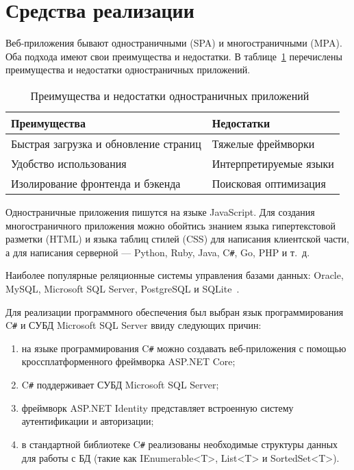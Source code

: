 \documentclass{bmstu}
\begin{document}
\section{Средства реализации}

Веб-приложения бывают одностраничными (SPA) и многостраничными (MPA). 
Оба подхода имеют свои преимущества и недостатки. 
В таблице~\ref{tabular:spa} перечислены преимущества и недостатки одностраничных приложений.

\begin{table}[H]
\caption{Преимущества и недостатки одностраничных приложений~\cite{Bekasov2023}}
\label{tabular:spa}
\begin{tabular}{|>{\raggedleft}p{8cm}|>{\raggedleft}p{8cm}|}
\hline
\textbf{Преимущества} & \textbf{Недостатки}
\tabularnewline
\hline
Быстрая загрузка и обновление страниц & Тяжелые фреймворки
\tabularnewline
\hline
Удобство использования & Интерпретируемые языки
\tabularnewline
\hline
Изолирование фронтенда и бэкенда & Поисковая оптимизация
\tabularnewline
\hline
\end{tabular}
\end{table}

Одностраничные приложения пишутся на языке JavaScript. 
Для создания многостраничного приложения можно обойтись знанием языка гипертекстовой разметки (HTML) и языка таблиц стилей (CSS) для написания клиентской части, а для написания серверной --- Python, Ruby, Java, C\texttt{\#}, Go, PHP и т.~д.~\cite{Bekasov2023}

Наиболее популярные реляционные системы управления базами данных: Oracle, MySQL, Microsoft SQL Server, PostgreSQL и SQLite~\cite{Statistics1}\cite{Statistics2}.

Для реализации программного обеспечения был выбран язык программирования C\texttt{\#} и СУБД Microsoft SQL Server ввиду следующих причин:

\begin{enumerate}
\item[1)] на языке программирования C\texttt{\#} можно создавать веб-приложения с помощью кроссплатформенного фреймворка ASP.NET Core;
\item[2)] C\texttt{\#} поддерживает СУБД Microsoft SQL Server;
\item[3)] фреймворк ASP.NET Identity представляет встроенную систему аутентификации и авторизации;
\item[4)] в стандартной библиотеке C\texttt{\#} реализованы необходимые структуры данных для работы с БД (такие как IEnumerable<T>, List<T> и SortedSet<T>).
\end{enumerate}
\end{document}
